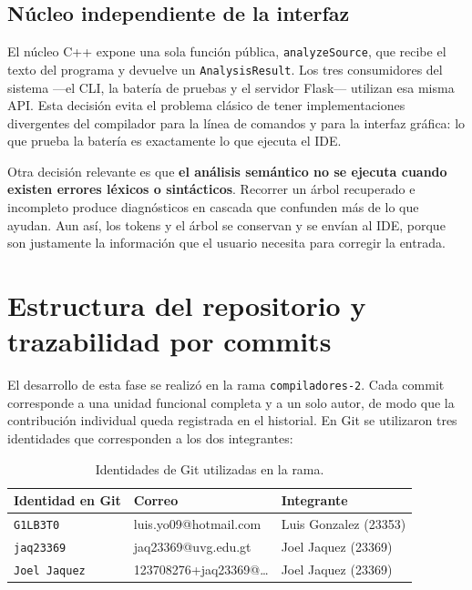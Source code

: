 \documentclass[11pt,a4paper]{article}
\begin{document}
\subsection{Núcleo independiente de la interfaz}

El núcleo C++ expone una sola función pública, \texttt{analyzeSource}, que
recibe el texto del programa y devuelve un \texttt{AnalysisResult}. Los tres
consumidores del sistema ---el CLI, la batería de pruebas y el servidor
Flask--- utilizan esa misma API. Esta decisión evita el problema clásico de
tener implementaciones divergentes del compilador para la línea de comandos y
para la interfaz gráfica: lo que prueba la batería es exactamente lo que
ejecuta el IDE.

Otra decisión relevante es que \textbf{el análisis semántico no se ejecuta
cuando existen errores léxicos o sintácticos}. Recorrer un árbol recuperado e
incompleto produce diagnósticos en cascada que confunden más de lo que ayudan.
Aun así, los tokens y el árbol se conservan y se envían al IDE, porque son
justamente la información que el usuario necesita para corregir la entrada.

\section{Estructura del repositorio y trazabilidad por commits}

El desarrollo de esta fase se realizó en la rama \texttt{compiladores-2}. Cada
commit corresponde a una unidad funcional completa y a un solo autor, de modo
que la contribución individual queda registrada en el historial. En Git se
utilizaron tres identidades que corresponden a los dos integrantes:

\begin{table}[H]
\centering
\small
\begin{tabular}{lll}
\toprule
\textbf{Identidad en Git} & \textbf{Correo} & \textbf{Integrante} \\
\midrule
\texttt{G1LB3T0}      & luis.yo09@hotmail.com   & Luis Gonzalez (23353) \\
\texttt{jaq23369}     & jaq23369@uvg.edu.gt     & Joel Jaquez (23369) \\
\texttt{Joel Jaquez}  & 123708276+jaq23369@\dots & Joel Jaquez (23369) \\
\bottomrule
\end{tabular}
\caption{Identidades de Git utilizadas en la rama.}
\end{table}
\end{document}
